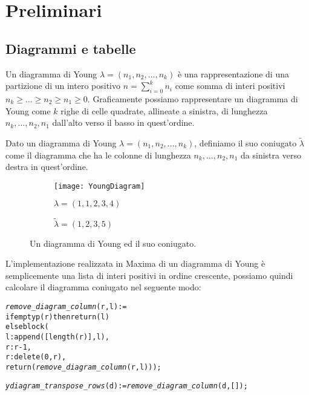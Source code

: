 \chapter{Preliminari}

\section{Diagrammi e tabelle}

\begin{defn}
Un diagramma di Young $\lambda=(n_1,n_2,\dots,n_k)$ \`e una
rappresentazione di una partizione di un intero positivo $n =
\sum_{i=0}^{k}{n_i}$ come somma di interi positivi $n_k \geq \ldots \geq
n_2 \geq n_1 \geq 0$. Graficamente possiamo rappresentare un diagramma di
Young come $k$ righe di celle quadrate, allineate a sinistra, di
lunghezza $n_k,\ldots,n_2,n_1$ dall'alto verso il basso in quest'ordine.
\end{defn}

\begin{defn}
Dato un diagramma di Young $\lambda=(n_1,n_2,\dots,n_k)$, definiamo il
suo coniugato $\tilde{\lambda}$ come il diagramma che ha le colonne di
lunghezza $n_k,\ldots,n_2,n_1$ da sinistra verso destra in quest'ordine.  
\end{defn}

\begin{figure}[h]
\centering

\begin{subfigure}[b]{0.4\textwidth}
\centering
\texttt{[image: YoungDiagram]}
\caption{$\lambda=(1,1,2,3,4)$}
\end{subfigure}%
\begin{subfigure}[b]{0.4\textwidth}
\centering
{}
\caption{$\tilde{\lambda}=(1,2,3,5)$}
\end{subfigure}
\caption{Un diagramma di Young ed il suo coniugato.}
\end{figure}

L'implementazione realizzata in Maxima di un diagramma di Young \`e
semplicemente una lista di interi positivi in ordine crescente,
possiamo quindi calcolare il diagramma coniugato nel seguente modo:

\begin{alltt}
\emph{remove\_diagram\_column} (r, l) := 
if emptyp (r) then return (l)
else block (
  l : append ([length (r)], l),
  r : r-1,
  r : delete (0, r),
  return (\emph{remove\_diagram\_column} (r, l)));

\emph{ydiagram\_transpose\_rows} (d) := \emph{remove\_diagram\_column} (d, []);
\end{alltt}

